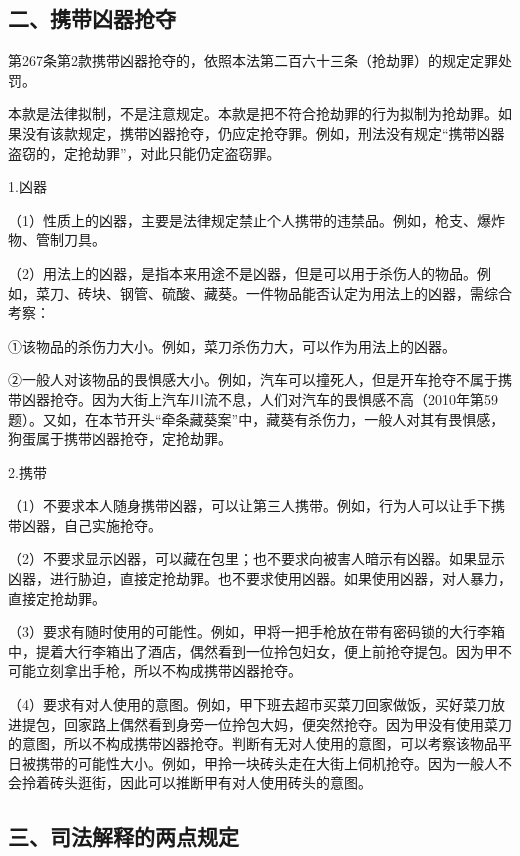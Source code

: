 \subsection*{二、携带凶器抢夺}

第267条第2款携带凶器抢夺的，依照本法第二百六十三条（抢劫罪）的规定定罪处罚。

本款是法律拟制，不是注意规定。本款是把不符合抢劫罪的行为拟制为抢劫罪。如果没有该款规定，携带凶器抢夺，仍应定抢夺罪。例如，刑法没有规定“携带凶器盗窃的，定抢劫罪”，对此只能仍定盗窃罪。

1.凶器

（1）性质上的凶器，主要是法律规定禁止个人携带的违禁品。例如，枪支、爆炸物、管制刀具。

（2）用法上的凶器，是指本来用途不是凶器，但是可以用于杀伤人的物品。例如，菜刀、砖块、钢管、硫酸、藏葵。一件物品能否认定为用法上的凶器，需综合考察：

①该物品的杀伤力大小。例如，菜刀杀伤力大，可以作为用法上的凶器。

②一般人对该物品的畏惧感大小。例如，汽车可以撞死人，但是开车抢夺不属于携带凶器抢夺。因为大街上汽车川流不息，人们对汽车的畏惧感不高（2010年第59题）。又如，在本节开头“牵条藏葵案”中，藏葵有杀伤力，一般人对其有畏惧感，狗蛋属于携带凶器抢夺，定抢劫罪。

2.携带

（1）不要求本人随身携带凶器，可以让第三人携带。例如，行为人可以让手下携带凶器，自己实施抢夺。

（2）不要求显示凶器，可以藏在包里；也不要求向被害人暗示有凶器。如果显示凶器，进行胁迫，直接定抢劫罪。也不要求使用凶器。如果使用凶器，对人暴力，直接定抢劫罪。

（3）要求有随时使用的可能性。例如，甲将一把手枪放在带有密码锁的大行李箱中，提着大行李箱出了酒店，偶然看到一位拎包妇女，便上前抢夺提包。因为甲不可能立刻拿出手枪，所以不构成携带凶器抢夺。

（4）要求有对人使用的意图。例如，甲下班去超市买菜刀回家做饭，买好菜刀放进提包，回家路上偶然看到身旁一位拎包大妈，便突然抢夺。因为甲没有使用菜刀的意图，所以不构成携带凶器抢夺。判断有无对人使用的意图，可以考察该物品平日被携带的可能性大小。例如，甲拎一块砖头走在大街上伺机抢夺。因为一般人不会拎着砖头逛街，因此可以推断甲有对人使用砖头的意图。

\subsection*{三、司法解释的两点规定\protect\footnotemark}

